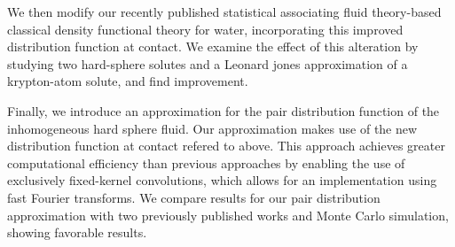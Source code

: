 We then modify our recently published statistical associating fluid
theory-based classical density functional theory for water,
incorporating this improved distribution function at contact.  We
examine the effect of this alteration by studying two hard-sphere
solutes and a Leonard jones approximation of a krypton-atom solute,
and find improvement.
%

Finally, we introduce an approximation for the pair distribution
function of the inhomogeneous hard sphere fluid. Our approximation
makes use of the new distribution function at contact refered to
above. This approach achieves greater computational efficiency than
previous approaches by enabling the use of exclusively fixed-kernel
convolutions, which allows for an implementation using fast Fourier
transforms. We compare results for our pair distribution approximation
with two previously published works and Monte Carlo simulation,
showing favorable results.



